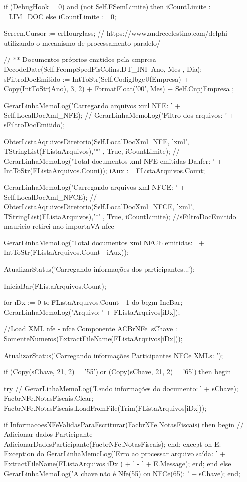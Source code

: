 if (DebugHook = 0) and (not Self.FSemLimite) then
      iCountLimite := _LIM_DOC
   else
      iCountLimite := 0;

  Screen.Cursor := crHourglass;
 //  https://www.andrecelestino.com/delphi-utilizando-o-mecanismo-de-processamento-paralelo/

   // ** Documentos próprios emitidos pela empresa
   DecodeDate(Self.FcompSpedPisCofins.DT_INI, Ano, Mes , Dia);
   sFiltroDocEmitido := IntToStr(Self.CodigIbgeUfEmpresa) + Copy(IntToStr(Ano), 3, 2) + FormatFloat('00', Mes) + Self.CnpjEmpresa ;

   GerarLinhaMemoLog('Carregando arquivos xml NFE: ' + Self.LocalDocXml_NFE);
  // GerarLinhaMemoLog('Filtro dos arquivos: ' + sFiltroDocEmitido);

   ObterListaAqruivosDiretorio(Self.LocalDocXml_NFE, 'xml', TStringList(FListaArquivos),'*' , True, iCountLimite);
  // GerarLinhaMemoLog('Total documentos xml NFE emitidas Danfer: ' + IntToStr(FListaArquivos.Count));
   iAux := FListaArquivos.Count;

   GerarLinhaMemoLog('Carregando arquivos xml NFCE: ' + Self.LocalDocXml_NFCE);
  // ObterListaAqruivosDiretorio(Self.LocalDocXml_NFCE, 'xml', TStringList(FListaArquivos),'*' , True, iCountLimite); //sFiltroDocEmitido  mauricio  retirei nao importaVA nfce

   GerarLinhaMemoLog('Total documentos xml NFCE emitidas: ' + IntToStr(FListaArquivos.Count - iAux));


   AtualizarStatus('Carregando informações dos participantes...');

   IniciaBar(FListaArquivos.Count);

   for iDx := 0 to FListaArquivos.Count - 1 do
      begin
         IncBar;
         GerarLinhaMemoLog('Arquivo: ' + FListaArquivos[iDx]);


         //Load XML nfe - nfce Componente ACBrNFe;
         sChave := SomenteNumeros(ExtractFileName(FListaArquivos[iDx]));

         AtualizarStatus('Carregando informações Participantes NFCe XMLs: ');

         if (Copy(sChave, 21, 2) = '55') or (Copy(sChave, 21, 2) = '65') then
            begin

               try
                //  GerarLinhaMemoLog('Lendo informações do documento: ' + sChave);
                  FacbrNFe.NotasFiscais.Clear;
                  FacbrNFe.NotasFiscais.LoadFromFile(Trim(FListaArquivos[iDx]));

                  if InformacoesNFeValidasParaEscriturar(FacbrNFe.NotasFiscais) then
                     begin
                        // Adicionar dados Participante
                        AdicionarDadosParticipante(FacbrNFe.NotasFiscais);
                     end;
               except
                  on E: Exception do
                     GerarLinhaMemoLog('Erro ao processar arquivo saída: ' + ExtractFileName(FListaArquivos[iDx]) + ' - ' + E.Message);
               end;
            end
         else
           GerarLinhaMemoLog('A chave não é Nfe(55) ou NFCe(65): ' + sChave);
      end;




